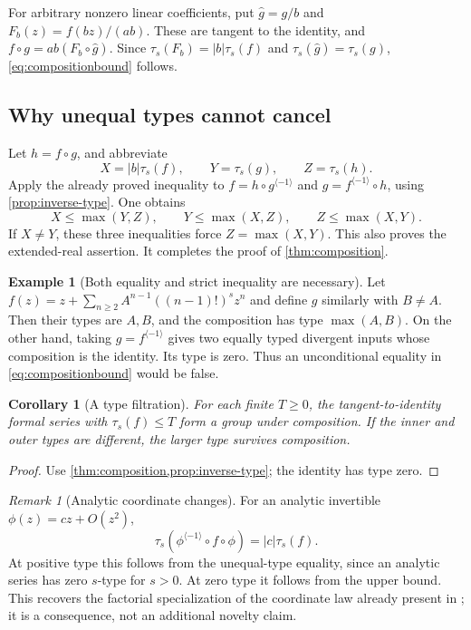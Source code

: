 \documentclass[11pt,a4paper]{article}
\newtheorem{corollary}[theorem]{Corollary}
\theoremstyle{definition}
\newtheorem{example}[theorem]{Example}
\theoremstyle{remark}
\newtheorem{remark}[theorem]{Remark}
\newcommand{\typ}{\tau_s}
\newcommand{\inv}{^{\langle-1\rangle}}
\numberwithin{equation}{section}
\begin{document}
For arbitrary nonzero linear coefficients, put
$\widehat g=g/b$ and $F_b(z)=f(bz)/(ab)$. These are tangent to the
identity, and $f\circ g=ab(F_b\circ\widehat g)$. Since
$\typ(F_b)=|b|\typ(f)$ and $\typ(\widehat g)=\typ(g)$,
\eqref{eq:compositionbound} follows.

\subsection{Why unequal types cannot cancel}
Let $h=f\circ g$, and abbreviate
\[
 X=|b|\typ(f),\qquad Y=\typ(g),\qquad Z=\typ(h).
\]
Apply the already proved inequality to
$f=h\circ g\inv$ and $g=f\inv\circ h$, using
\cref{prop:inverse-type}. One obtains
\begin{equation}
 X\le\max(Y,Z),\qquad Y\le\max(X,Z),\qquad Z\le\max(X,Y).
 \label{eq:threemax}
\end{equation}
If $X\ne Y$, these three inequalities force $Z=\max(X,Y)$.
This also proves the extended-real assertion. It completes the proof
of \cref{thm:composition}.

\begin{example}[Both equality and strict inequality are necessary]
Let
$f(z)=z+\sum_{n\ge2}A^{n-1}((n-1)!)^s z^n$ and define $g$ similarly
with $B\ne A$. Then their types are $A,B$, and the composition has type
$\max(A,B)$. On the other hand, taking $g=f\inv$ gives two equally
typed divergent inputs whose composition is the identity. Its type is
zero. Thus an unconditional equality in \eqref{eq:compositionbound}
would be false.
\end{example}

\begin{corollary}[A type filtration]
For each finite $T\ge0$, the tangent-to-identity formal series with
$\typ(f)\le T$ form a group under composition. If the inner and outer
types are different, the larger type survives composition.
\end{corollary}
\begin{proof}
Use \cref{thm:composition,prop:inverse-type}; the identity has type zero.
\end{proof}

\begin{remark}[Analytic coordinate changes]
For an analytic invertible $\phi(z)=cz+O(z^2)$,
\[
 \typ(\phi\inv\circ f\circ\phi)=|c|\typ(f).
\]
At positive type this follows from the unequal-type equality, since an
analytic series has zero $s$-type for $s>0$. At zero type it follows
from the upper bound. This recovers the factorial specialization of the
coordinate law already present in \cite{weighted}; it is a consequence,
not an additional novelty claim.
\end{remark}
\end{document}
